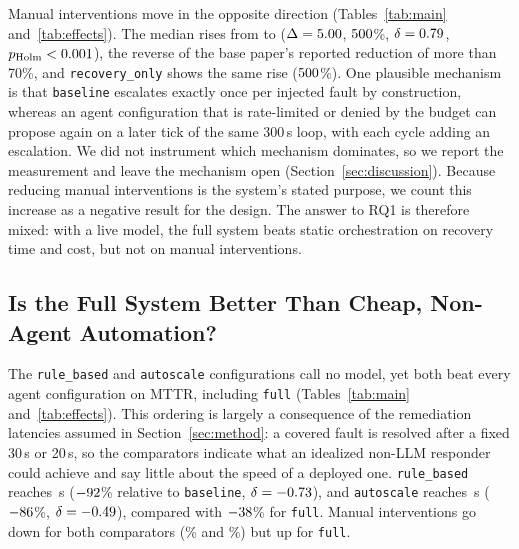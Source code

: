 Manual interventions move in the opposite direction (Tables~\ref{tab:main} and~\ref{tab:effects}).
The median rises from \NIntervBaselineMedian{}
to \NIntervFullMedian{} ($\Delta=5.00{}$,
$500{}$\%, $\delta=0.79{}$,
$p_{\mathrm{Holm}}<0.001{}$), the reverse of the base paper's reported
reduction of more than 70\%, and \texttt{recovery\_only} shows the same rise
($500{}$\%). One plausible mechanism is that \texttt{baseline}
escalates exactly once per injected fault by construction, whereas an agent configuration that is
rate-limited or denied by the budget can propose again on a later tick of the same 300\,s loop, with
each cycle adding an escalation. We did not instrument which mechanism dominates, so we report the
measurement and leave the mechanism open (Section~\ref{sec:discussion}). Because reducing manual
interventions is the system's stated purpose, we count this increase as a negative result for the
design. The answer to RQ1 is therefore mixed: with a live model, the full system beats static
orchestration on recovery time and cost, but not on manual interventions.

\subsection{Is the Full System Better Than Cheap, Non-Agent Automation?}

The \texttt{rule\_based} and \texttt{autoscale} configurations call no model, yet both beat every
agent configuration on MTTR, including \texttt{full} (Tables~\ref{tab:main}
and~\ref{tab:effects}). This ordering is largely a consequence of the
remediation latencies assumed in Section~\ref{sec:method}: a covered fault is resolved after a fixed
30\,s or 20\,s, so the comparators indicate what an idealized non-LLM responder could achieve and say
little about the speed of a deployed one. \texttt{rule\_based} reaches \NMttrRuleBasedMedian{}\,s
($-92{}$\% relative to \texttt{baseline}, $\delta=-0.73{}$), and
\texttt{autoscale} reaches \NMttrAutoscaleMedian{}\,s ($-86{}$\%,
$\delta=-0.49{}$), compared with $-38{}$\% for \texttt{full}. Manual
interventions go down for both comparators (\mbox{\NRelpctManualInterventionsRuleBased{}\%} and
\mbox{\NRelpctManualInterventionsAutoscale{}\%}) but up for \texttt{full}.

